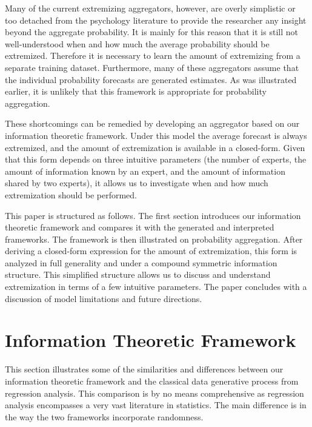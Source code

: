 \documentclass[11pt,twoside]{article}
\begin{document}
Many of the current extremizing aggregators, however, are overly simplistic or too detached from the psychology literature to provide the researcher any insight beyond the aggregate probability. It is mainly for this reason that it is still not well-understood when and how much the average probability should be extremized. Therefore it is necessary to learn the amount of extremizing from a separate training dataset. Furthermore, many of these aggregators assume that the individual probability forecasts are generated estimates. As was illustrated earlier, it is unlikely that this framework is appropriate for probability aggregation.

These shortcomings can be remedied by developing an aggregator based on our information theoretic framework. Under this model the average forecast is always extremized, and the amount of extremization is available in a closed-form. Given that this form depends on three intuitive parameters (the number of experts, the amount of information known by an expert, and the amount of information shared by two experts), it allows us to investigate when and how much extremization should be performed. 

This paper is structured as follows. The first section introduces our information theoretic framework and  compares it with the generated and interpreted frameworks. The framework is then illustrated on probability aggregation. After deriving a closed-form expression for the amount of extremization, this form is analyzed in full generality and under a compound symmetric information structure. This simplified structure allows us to discuss and understand extremization in terms of a few intuitive parameters. The paper concludes with a discussion of  model limitations and future directions. 



\section{Information Theoretic Framework}
This section illustrates some of the similarities and differences between our information theoretic framework and the classical data generative process from regression analysis. This comparison is by no means comprehensive as regression analysis encompasses a very vast literature in statistics. The main difference is in the way the two frameworks incorporate randomness.
\end{document}

